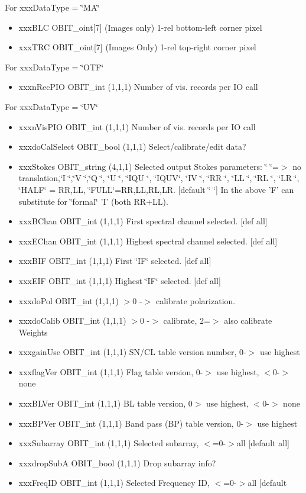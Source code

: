 \begin{Desc}
\begin{description}
For xxx\-Data\-Type = \char`\"{}MA\char`\"{} \begin{itemize}
\item xxx\-BLC OBIT\_\-oint[7] (Images only) 1-rel bottom-left corner pixel \item xxx\-TRC OBIT\_\-oint[7] (Images Only) 1-rel top-right corner pixel\end{itemize}
For xxx\-Data\-Type = \char`\"{}OTF\char`\"{} \begin{itemize}
\item xxxn\-Rec\-PIO OBIT\_\-int (1,1,1) Number of vis. records per IO call\end{itemize}
For xxx\-Data\-Type = \char`\"{}UV\char`\"{} \begin{itemize}
\item xxxn\-Vis\-PIO OBIT\_\-int (1,1,1) Number of vis. records per IO call \item xxxdo\-Cal\-Select OBIT\_\-bool (1,1,1) Select/calibrate/edit data? \item xxx\-Stokes OBIT\_\-string (4,1,1) Selected output Stokes parameters: \char`\"{}    \char`\"{}=$>$ no translation,\char`\"{}I   \char`\"{},\char`\"{}V   \char`\"{},\char`\"{}Q   \char`\"{}, \char`\"{}U   \char`\"{}, \char`\"{}IQU \char`\"{}, \char`\"{}IQUV\char`\"{}, \char`\"{}IV  \char`\"{}, \char`\"{}RR  \char`\"{}, \char`\"{}LL  \char`\"{}, \char`\"{}RL  \char`\"{}, \char`\"{}LR  \char`\"{}, \char`\"{}HALF\char`\"{} = RR,LL, \char`\"{}FULL\char`\"{}=RR,LL,RL,LR. [default \char`\"{}    \char`\"{}] In the above 'F' can substitute for \char`\"{}formal\char`\"{} 'I' (both RR+LL). \item xxx\-BChan OBIT\_\-int (1,1,1) First spectral channel selected. [def all] \item xxx\-EChan OBIT\_\-int (1,1,1) Highest spectral channel selected. [def all] \item xxx\-BIF OBIT\_\-int (1,1,1) First \char`\"{}IF\char`\"{} selected. [def all] \item xxx\-EIF OBIT\_\-int (1,1,1) Highest \char`\"{}IF\char`\"{} selected. [def all] \item xxxdo\-Pol OBIT\_\-int (1,1,1) $>$0 -$>$ calibrate polarization. \item xxxdo\-Calib OBIT\_\-int (1,1,1) $>$0 -$>$ calibrate, 2=$>$ also calibrate Weights \item xxxgain\-Use OBIT\_\-int (1,1,1) SN/CL table version number, 0-$>$ use highest \item xxxflag\-Ver OBIT\_\-int (1,1,1) Flag table version, 0-$>$ use highest, $<$0-$>$ none \item xxx\-BLVer OBIT\_\-int (1,1,1) BL table version, 0$>$ use highest, $<$0-$>$ none \item xxx\-BPVer OBIT\_\-int (1,1,1) Band pass (BP) table version, 0-$>$ use highest \item xxx\-Subarray OBIT\_\-int (1,1,1) Selected subarray, $<$=0-$>$all [default all] \item xxxdrop\-Sub\-A OBIT\_\-bool (1,1,1) Drop subarray info? \item xxx\-Freq\-ID OBIT\_\-int (1,1,1) Selected Frequency ID, $<$=0-$>$all [default 
\end{itemize}
\end{description}
\end{Desc}
